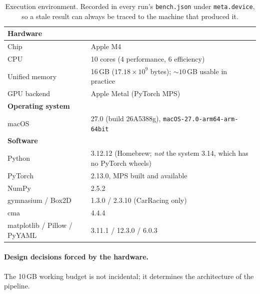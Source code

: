 \documentclass[11pt,a4paper]{article}
\newcommand{\code}[1]{\texttt{\small #1}}
\begin{document}
\begin{table}[h]
\centering
\begin{tabular}{ll}
\toprule
\multicolumn{2}{l}{\textbf{Hardware}}\\
\midrule
Chip                & Apple M4 \\
CPU                 & 10 cores (4 performance, 6 efficiency) \\
Unified memory      & 16\,GB ($17.18\times10^{9}$ bytes); ${\sim}10$\,GB usable in practice \\
GPU backend         & Apple Metal (PyTorch MPS) \\
\midrule
\multicolumn{2}{l}{\textbf{Operating system}}\\
\midrule
macOS               & 27.0 (build 26A5388g), \code{macOS-27.0-arm64-arm-64bit} \\
\midrule
\multicolumn{2}{l}{\textbf{Software}}\\
\midrule
Python              & 3.12.12 (Homebrew; \emph{not} the system 3.14, which has no PyTorch wheels) \\
PyTorch             & 2.13.0, MPS built and available \\
NumPy               & 2.5.2 \\
gymnasium / Box2D   & 1.3.0 / 2.3.10 (CarRacing only) \\
cma                 & 4.4.4 \\
matplotlib / Pillow / PyYAML & 3.11.1 / 12.3.0 / 6.0.3 \\
\bottomrule
\end{tabular}
\caption{Execution environment. Recorded in every run's \code{bench.json} under
\code{meta.device}, so a stale result can always be traced to the machine that
produced it.}
\end{table}

\paragraph{Design decisions forced by the hardware.} The 10\,GB working budget
is not incidental; it determines the architecture of the pipeline.
\end{document}
